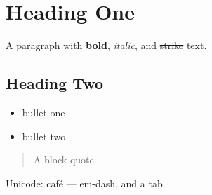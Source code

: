 \documentclass[
]{article}
\author{}
\date{}
\providecommand{\tightlist}{%
  \setlength{\itemsep}{0pt}\setlength{\parskip}{0pt}}
\begin{document}
\hypertarget{heading-one}{%
\section{Heading One}\label{heading-one}}

A paragraph with \textbf{bold}, \emph{italic}, and \st{strike} text.

\hypertarget{heading-two}{%
\subsection{Heading Two}\label{heading-two}}

\begin{itemize}
\tightlist
\item
  bullet one
\item
  bullet two
\end{itemize}

\begin{quote}
A block quote.
\end{quote}

Unicode: café --- em-dash, and a tab.
\end{document}
